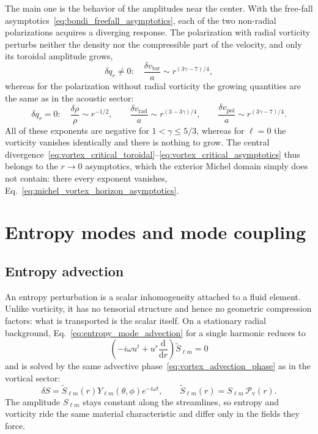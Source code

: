 \documentclass[12pt,a4paper,preprint,nopreprintline]{elsarticle}
\begin{document}
The main one is the behavior of the amplitudes near the center. With the free-fall asymptotics~\eqref{eq:bondi_freefall_asymptotics}, each of the two non-radial polarizations acquires a diverging response. The polarization with radial vorticity perturbs neither the density nor the compressible part of the velocity, and only its toroidal amplitude grows,
\begin{equation}
    \delta q_{r}\neq0:
    \quad
    \frac{\delta v_{\mathrm{tor}}}{a}
    \sim r^{(3\gamma-7)/4},
    \label{eq:vortex_critical_toroidal}
\end{equation}
whereas for the polarization without radial vorticity the growing quantities are the same as in the acoustic sector:
\begin{equation}
    \delta q_{r}=0:
    \quad
    \frac{\delta\rho}{\rho}
    \sim r^{-1/2},
    \qquad
    \frac{\delta v_{\mathrm{rad}}}{a}
    \sim r^{(3-3\gamma)/4},
    \qquad
    \frac{\delta v_{\mathrm{pol}}}{a}
    \sim r^{(3\gamma-7)/4}.
    \label{eq:vortex_critical_asymptotics}
\end{equation}
All of these exponents are negative for $1<\gamma\leq5/3$, whereas for $\ell=0$ the vorticity vanishes identically and there is nothing to grow. The central divergence~\eqref{eq:vortex_critical_toroidal}--\eqref{eq:vortex_critical_asymptotics} thus belongs to the $r\rightarrow0$ asymptotics, which the exterior Michel domain simply does not contain: there every exponent vanishes, Eq.~\eqref{eq:michel_vortex_horizon_asymptotics}.

\section{Entropy modes and mode coupling}
\label{sec:entropy}

\subsection{Entropy advection}
\label{sec:entropy_advection}

An entropy perturbation is a scalar inhomogeneity attached to a fluid element. Unlike vorticity, it has no tensorial structure and hence no geometric compression factors: what is transported is the scalar itself. On a stationary radial background, Eq.~\eqref{eq:entropy_mode_advection} for a single harmonic reduces to
\begin{equation}
    \left(
        -i\omega u^{t}+u^{r}\frac{\mathrm{d}}{\mathrm{d}r}
    \right)\widetilde{S}_{\ell m}=0
\end{equation}
and is solved by the same advective phase~\eqref{eq:vortex_advection_phase} as in the vortical sector:
\begin{equation}
    \delta S
    =
    \widetilde{S}_{\ell m}(r)
    Y_{\ell m}(\theta,\phi)e^{-i\omega t},
    \qquad
    \widetilde{S}_{\ell m}(r)
    =
    S_{\ell m}\,
    \mathcal{P}_{\mathrm{v}}(r).
    \label{eq:entropy_advection_solution}
\end{equation}
The amplitude $S_{\ell m}$ stays constant along the streamlines, so entropy and vorticity ride the same material characteristic and differ only in the fields they force.
\end{document}

